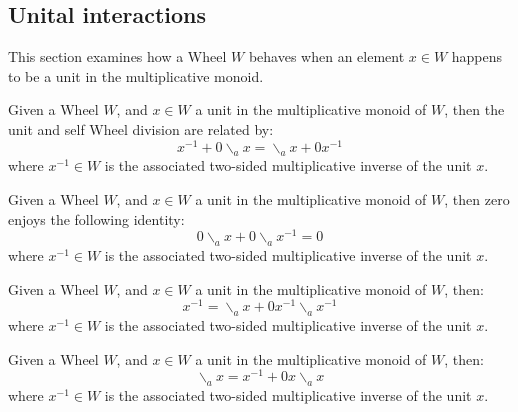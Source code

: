 \subsection{Unital interactions}
This section examines how a Wheel $W$ behaves when an element $x \in W$ happens to be a unit in the multiplicative monoid.
\begin{proposition}
  \label{prop:wdiv_inv_add_div}
  \leanok
  Given a Wheel $W$, and $x \in W$ a unit in the multiplicative monoid of $W$, then the unit and self Wheel division are 
  related by:
  \begin{equation}
    x^{-1} + 0\backslash_{a}x = \backslash_{a}x + 0x^{-1}
  \end{equation}
  where $x^{-1} \in W$ is the associated two-sided multiplicative inverse of the unit $x$.
\end{proposition} 
\begin{proposition}
  \label{prop:isUnit_zero_eq_div_mul_add}
  \leanok
  Given a Wheel $W$, and $x \in W$ a unit in the multiplicative monoid of $W$, then zero enjoys the following identity: 
  \begin{equation}
    0\backslash_{a}x + 0\backslash_{a}x^{-1} = 0
  \end{equation}
  where $x^{-1} \in W$ is the associated two-sided multiplicative inverse of the unit $x$.
\end{proposition} 
\begin{proposition}
  \label{prop:isUnit_inv_eq_div_add}
  \leanok
  Given a Wheel $W$, and $x \in W$ a unit in the multiplicative monoid of $W$, then: 
  \begin{equation}
    x^{-1} = \backslash_{a}x + 0x^{-1}\backslash_{a}x^{-1}
  \end{equation}
  where $x^{-1} \in W$ is the associated two-sided multiplicative inverse of the unit $x$.
\end{proposition} 
\begin{proposition}
  \label{prop:isUnit_div_eq_inv_add}
  \leanok
  Given a Wheel $W$, and $x \in W$ a unit in the multiplicative monoid of $W$, then: 
  \begin{equation}
    \backslash_{a}x = x^{-1} + 0x\backslash_{a}x
  \end{equation}
  where $x^{-1} \in W$ is the associated two-sided multiplicative inverse of the unit $x$.
\end{proposition}
